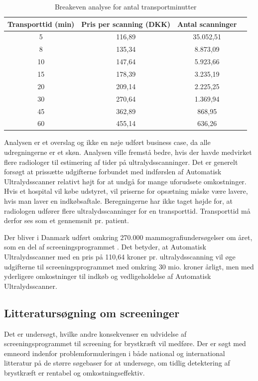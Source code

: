 \begin{table}[H]
\centering
\begin{tabular}{ | c | c | c | p{} | }
\hline
\textbf{Transporttid (min)} & \textbf{Pris per scanning (DKK)} & \textbf{Antal scanninger} \\\hline
5 & 116,89 & 35.052,51 \\\hline
8 & 135,34 & 8.873,09\\\hline
10 & 147,64 & 5.923,66\\\hline
15 & 178,39 & 3.235,19 \\\hline
20 & 209,14 & 2.225,25\\\hline
30 & 270,64 & 1.369,94\\\hline
45 & 362,89 & 868,95 \\\hline
60 & 455,14 & 636,26 \\\hline
\end{tabular}
\caption{Breakeven analyse for antal transportminutter}
\label{Breakeven}
\end{table}

Analysen er et overslag og ikke en nøje udført business case, da alle udregningerne er et skøn. Analysen ville fremstå bedre, hvis der havde medvirket flere radiologer til estimering af tider på ultralydsscanninger. Det er generelt forsøgt at prissætte udgifterne forbundet med indførslen af Automatisk Ultralydsscanner relativt højt for at undgå for mange uforudsete omkostninger. Hvis et hospital vil købe udstyret, vil priserne for opsætning måske være lavere, hvis man laver en indkøbsaftale. Beregningerne har ikke taget højde for, at radiologen udfører flere ultralydsscanninger for en transporttid. Transporttid må derfor ses som et gennemsnit pr. patient.

Der bliver i Danmark udført omkring 270.000 mammografiundersøgelser om året, som en del af screeningsprogrammet \cite{esundhed}. Det betyder, at Automatisk Ultralydsscanner med en pris på 110,64 kroner pr. ultralydsscanning vil øge udgifterne til screeningsprogrammet med omkring 30 mio. kroner årligt, men med yderligere omkostninger til indkøb og vedligeholdelse af Automatisk Ultralydsscanner. 

\subsection{Litteratursøgning om screeninger}
Det er undersøgt, hvilke andre konsekvenser en udvidelse af screeningsprogrammet til screening for brystkræft vil medføre. Der er søgt med emneord indenfor problemformuleringen i både national og international litteratur på de større søgebaser for at undersøge, om tidlig detektering af brystkræft er rentabel og omkostningseffektiv. 

